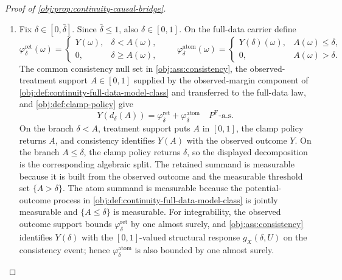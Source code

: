 \documentclass[11pt]{article}
\begin{document}
\begin{proof}[Proof of \cref{obj:prop:continuity-causal-bridge}]
\begin{enumerate}
\[
m_x^{\mathrm F}(a)\pi_x(a)
=
\mu_{x,\mathrm{cont}}^P(a)\pi_x(a)
\quad\text{for Lebesgue-a.e. }a\in[0,\bar\delta].
\]
For Lebesgue-a.e. \(a\in(0,\bar\delta]\), \cref{obj:ass:polynomial-thinning} also gives
\[
\pi_x(a)\ge c_-a^\kappa>0 .
\]
Since the endpoint \(0\) has Lebesgue measure zero, the two continuous functions \(m_x^{\mathrm F}\) and \(\mu_{x,\mathrm{cont}}^P\) agree Lebesgue-a.e. on \([0,\bar\delta]\).  Applying the continuous-version uniqueness principle in \cref{obj:lem:continuity-regression-extension-unique},
\[
m_x^{\mathrm F}(a)=\mu_{x,\mathrm{cont}}^P(a)
\qquad
\text{for every }a\in[0,\bar\delta].
\]

\item Fix \(\delta\in[0,\bar\delta]\).  Since \(\bar\delta\le1\), also \(\delta\in[0,1]\).  On the full-data carrier define
\[
\varphi_{\delta}^{\mathrm{ret}}(\omega)
=
\begin{cases}
Y(\omega),& \delta<A(\omega),\\
0,& \delta\ge A(\omega),
\end{cases}
\qquad
\varphi_{\delta}^{\mathrm{atom}}(\omega)
=
\begin{cases}
Y(\delta)(\omega),& A(\omega)\le\delta,\\
0,& A(\omega)>\delta.
\end{cases}
\]
The common consistency null set in \cref{obj:ass:consistency}, the observed-treatment support \(A\in[0,1]\) supplied by the observed-margin component of \cref{obj:def:continuity-full-data-model-class} and transferred to the full-data law, and \cref{obj:def:clamp-policy} give
\[
Y\!\left(d_\delta(A)\right)
=
\varphi_{\delta}^{\mathrm{ret}}
+
\varphi_{\delta}^{\mathrm{atom}}
\quad
P^{\mathrm F}\text{-a.s.}
\]
On the branch \(\delta<A\), treatment support puts \(A\) in \([0,1]\), the clamp policy returns \(A\), and consistency identifies \(Y(A)\) with the observed outcome \(Y\).  On the branch \(A\le\delta\), the clamp policy returns \(\delta\), so the displayed decomposition is the corresponding algebraic split.  The retained summand is measurable because it is built from the observed outcome and the measurable threshold set \(\{A>\delta\}\).  The atom summand is measurable because the potential-outcome process in \cref{obj:def:continuity-full-data-model-class} is jointly measurable and \(\{A\le\delta\}\) is measurable.  For integrability, the observed outcome support bounds \(\varphi_{\delta}^{\mathrm{ret}}\) by one almost surely, and \cref{obj:ass:consistency} identifies \(Y(\delta)\) with the \([0,1]\)-valued structural response \(g_X(\delta,U)\) on the consistency event; hence \(\varphi_{\delta}^{\mathrm{atom}}\) is also bounded by one almost surely.


\end{enumerate}
\end{proof}
\end{document}
